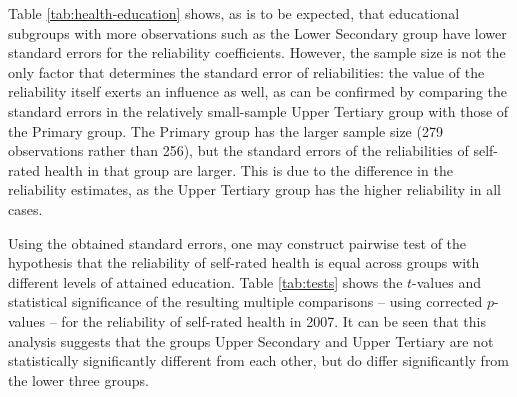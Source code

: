 \documentclass[a4paper,11pt]{article}
\newcommand{\0}{\boldsymbol{0}}
\begin{document}
Table \ref{tab:health-education} shows, as is to be expected, that educational subgroups with more observations 
such as the Lower Secondary group have lower standard errors for the reliability coefficients. However, the sample size
is not the only factor that determines the standard error of reliabilities: the value of the reliability itself exerts an influence as well,
as can be confirmed by comparing the standard errors in the relatively small-sample Upper Tertiary group with those of the Primary group.
The Primary group has the larger sample size (279 observations rather than 256), but the standard errors of the reliabilities
of self-rated health in that group are larger. This is due to the difference in the reliability estimates, as the Upper Tertiary group 
has the higher reliability in all cases.

Using the obtained standard errors, one may construct pairwise test of the hypothesis that the reliability of self-rated health
is equal across groups with different levels of attained education. Table \ref{tab:tests} shows the $t$-values and statistical significance of the resulting multiple comparisons -- using corrected $p$-values  \citep{holm1979simple} -- for the reliability of self-rated health in 2007. It can be seen that this analysis suggests that the 
groups Upper Secondary and Upper Tertiary are not statistically significantly different from each other, but do 
differ significantly from the lower three groups.
\end{document}
